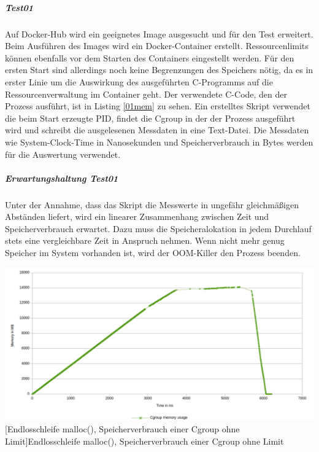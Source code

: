 \subparagraph{Test01}
Auf Docker-Hub wird ein geeignetes Image ausgesucht und für den Test erweitert. Beim Ausführen des Images wird ein Docker-Container erstellt. Ressourcenlimits können ebenfalls vor dem Starten des Containers eingestellt werden. Für den ersten Start sind allerdings noch keine Begrenzungen des Speichers nötig, da es in erster Linie um die Auswirkung des ausgeführten C-Programms auf die Ressourcenverwaltung im Container geht. Der verwendete C-Code, den der Prozess ausführt, ist in Listing \ref{01mem} zu sehen. Ein erstelltes Skript verwendet die beim Start erzeugte PID, findet die Cgroup in der der Prozess ausgeführt wird und schreibt die ausgelesenen Messdaten in eine Text-Datei. Die Messdaten wie System-Clock-Time in Nanosekunden und Speicherverbrauch in Bytes werden für die Auswertung verwendet.


\vspace{1em}


\subparagraph{Erwartungshaltung Test01}
Unter der Annahme, dass das Skript die Messwerte in ungefähr gleichmäßigen Abständen liefert, wird ein linearer Zusammenhang zwischen Zeit und Speicherverbrauch erwartet. Dazu muss die Speicheralokation in jedem Durchlauf stets eine vergleichbare Zeit in Anspruch nehmen. Wenn nicht mehr genug Speicher im System vorhanden ist, wird der OOM-Killer den Prozess beenden.

\vspace{2em}
\begin{minipage}{\linewidth}
	\centering
	\includegraphics[width=1\linewidth]{pics/001_mem_usage_No_Limit_Cgroup_RDY_FOR_USE.png}
	[Endlosschleife malloc(), Speicherverbrauch einer Cgroup ohne Limit]{Endlosschleife malloc(), Speicherverbrauch einer Cgroup ohne Limit}
	\label{fig:001_mem_usage_No_Limit_Cgroup_RDY_FOR_USE}
\end{minipage}


